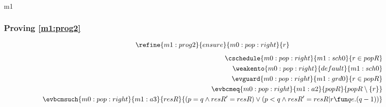 \documentclass[12pt]{amsart}
\begin{document}
\begin{machine}{m1}
\subsubsection{Proving \ref{m1:prog2}}
\begin{align*}
\refine{m1:prog2}{ensure}{m0:pop:right}{ \index{r}{r} }
\end{align*}
\begin{align*}
\cschedule{m0:pop:right}{m1:sch0}{ r \in popR }
\\ \weakento{m0:pop:right}{default}{m1:sch0}
\\ \evguard{m0:pop:right}{m1:grd0}{ r \in popR }
\\ \evbcmeq{m0:pop:right}{m1:a2}{popR}{ popR \setminus \{ r \} }
\\ \evbcmsuch{m0:pop:right}{m1:a3}{resR}{ (p = q \land resR' = resR) 
	\lor (p < q \land resR' = resR | r \fun qe.(q-1) ) }
\end{align*}



\end{machine}
\end{document}
